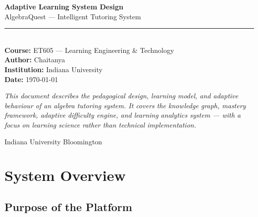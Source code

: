 \documentclass[12pt,a4paper]{article}
\begin{document}
\begin{titlepage}
  \centering
  \vspace*{2cm}

  {\Huge\bfseries\color{primaryblue} Adaptive Learning System Design}\\[0.5cm]
  {\large\color{slategray} AlgebraQuest — Intelligent Tutoring System}\\[0.3cm]
  \rule{\linewidth}{0.8pt}\\[1.5cm]

  {\large\textbf{Course:} ET605 — Learning Engineering \& Technology}\\[0.4cm]
  {\large\textbf{Author:} Chaitanya}\\[0.4cm]
  {\large\textbf{Institution:} Indiana University}\\[0.4cm]
  {\large\textbf{Date:} \today}\\[2cm]

  \begin{mdframed}[linecolor=primaryblue, linewidth=1.2pt,
                   innerleftmargin=14pt, innerrightmargin=14pt,
                   innertopmargin=12pt, innerbottommargin=12pt]
    \centering
    \textit{This document describes the pedagogical design, learning model, and
    adaptive behaviour of an algebra tutoring system. It covers the knowledge
    graph, mastery framework, adaptive difficulty engine, and learning analytics
    system — with a focus on learning science rather than technical
    implementation.}
  \end{mdframed}

  \vfill
  {\small Indiana University Bloomington}
\end{titlepage}

\tableofcontents
\newpage

\section{System Overview}

\subsection{Purpose of the Platform}
\end{document}
